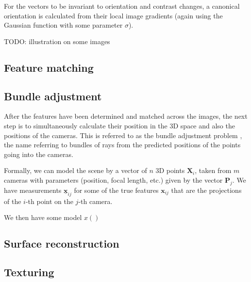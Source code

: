 For the vectors to be invariant to orientation and contrast changes, a canonical orientation is calculated from their local image gradients (again using the Gaussian function with some parameter $\sigma$).

TODO: illustration on some images

\subsection{Feature matching}

\subsection{Bundle adjustment}
After the features have been determined and matched across the images, the next step is to simultaneously calculate their position in the 3D space and also the positions of the cameras.
This is referred to as the bundle adjustment problem \cite{schneider19913,snavely2008modeling}, the name referring to bundles of rays from the predicted positions of the points going into the cameras.

Formally, we can model the scene by a vector of $n$ 3D points $\mathbf{X}_i$, taken from $m$ cameras with parameters (position, focal length, etc.) given by the vector $\mathbf{P}_j$.
We have measurements $\underline{\mathbf{x}}_{ij}$ for some of the true features $\mathbf{x}_{ij}$ that are the projections of the $i$-th point on the $j$-th camera.

We then have some model $x()$

\subsection{Surface reconstruction}

\subsection{Texturing}
%

